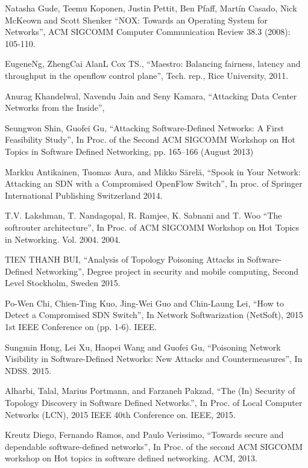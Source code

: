 \begin{thebibliography}{1}
Natasha Gude, Teemu Koponen, Justin Pettit, Ben Pfaff, Martín Casado, Nick McKeown and Scott Shenker
``NOX: Towards an Operating System for Networks'', ACM SIGCOMM Computer Communication Review 38.3 (2008): 105-110.

EugeneNg, ZhengCai AlanL Cox TS.,
``Maestro: Balancing fairness, latency and throughput in the openflow control plane'', Tech. rep., Rice University, 2011.

Anurag Khandelwal, Navendu Jain and Seny Kamara,
``Attacking Data Center Networks from the Inside'', 

Seungwon Shin, Guofei Gu, 
``Attacking Software-Defined Networks: A First Feasibility Study'', In Proc. of the Second ACM SIGCOMM Workshop on Hot Topics in Software Defined Networking, pp. 165–166 (August 2013)


Markku Antikainen, Tuomas Aura, and Mikko Särelä,
``Spook in Your Network: Attacking an SDN with a Compromised OpenFlow Switch'', In proc. of Springer International Publishing Switzerland 2014.

T.V. Lakshman, T. Nandagopal, R. Ramjee, K. Sabnani and T. Woo
``The softrouter architecture'', In Proc. of ACM SIGCOMM Workshop on Hot Topics in Networking. Vol. 2004. 2004.

TIEN THANH BUI,
``Analysis of Topology Poisoning Attacks in Software-Defined Networking'', Degree project in security and mobile computing, Second Level Stockholm, Sweden 2015.

Po-Wen Chi, Chien-Ting Kuo, Jing-Wei Guo and Chin-Laung Lei,
``How to Detect a Compromised SDN Switch'', In Network Softwarization (NetSoft), 2015 1st IEEE Conference on (pp. 1-6). IEEE.

Sungmin Hong, Lei Xu, Haopei Wang and Guofei Gu,
``Poisoning Network Visibility in Software-Defined Networks: New Attacks and Countermeasures'', In NDSS. 2015. 

Alharbi, Talal, Marius Portmann, and Farzaneh Pakzad,
``The (In) Security of Topology Discovery in Software Defined Networks.'', In Proc. of Local Computer Networks (LCN), 2015 IEEE 40th Conference on. IEEE, 2015.

Kreutz Diego, Fernando Ramos, and Paulo Verissimo, 
``Towards secure and dependable software-defined networks'', In Proc. of the second ACM SIGCOMM workshop on Hot topics in software defined networking. ACM, 2013.



\end{thebibliography}
